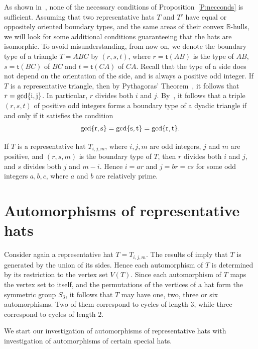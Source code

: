 \documentclass[12pt]{amsart}
\def\mbR{\mathbb{R}}
\theoremstyle{plain}
\theoremstyle{definition}
\numberwithin{equation}{section}
\begin{document}
As shown in~\cite[\S\S4,5]{MR25}, none of the necessary conditions of
Proposition~\ref{P:necconds} is sufficient.
Assuming that two representative hats $T$ and $T'$ have equal or oppositely oriented  boundary
types, and the same areas of their convex $\mbR$-hulls, we
will look for some additional conditions guaranteeing that the hats are isomorphic. To avoid
misunderstanding, from now on, we denote the boundary type of a triangle $T = ABC$ by $(r,s,t)$,
where $r = \mathsf{t}(AB)$ is the type of $AB$, $s = \mathsf{t}(BC)$ of $BC$ and
$t = \mathsf{t}(CA)$ of $CA$. Recall that the type of a side does not depend on the orientation of the side, and is always a positive odd integer. If $T$ is a representative triangle, then by Pythagoras' Theorem~\cite[Thm.~4.3]{MRS11}, it follows that $r = \rm{gcd}\{i,j\}$. In particular, $r$ divides both $i$ and $j$. By~\cite[Prop.~1.8]{MMR19a}, it follows that a triple $(r,s,t)$ of positive odd integers forms a boundary type of a dyadic triangle if and only if it satisfies the condition
\begin{equation}\label{E:rst}
\rm{gcd}\{r,s\} = \rm{gcd}\{s,t\} = \rm{gcd}\{r,t\}.
\end{equation}

If $T$ is a representative hat $T_{i,j,m}$, where $i, j, m$ are odd integers, $j$ and $m$ are
positive, and $(r,s,m)$ is the boundary type of $T$, then $r$ divides both $i$ and $j$, and $s$
divides both $j$ and $m-i$. Hence $i = ar$ and $j = br = cs$ for some odd integers $a, b,
c$, where $a$ and $b$ are relatively prime.




\section{Automorphisms of representative hats}\label{S:autoreprhats}

 Consider again a representative hat $T = T_{i,j,m}$. The results of \cite[\S6]{MMR23} imply
that $T$ is generated by the union of its sides. Hence each automorphism of $T$ is determined by its restriction to the vertex set $V(T)$.
Since each automorphism of $T$ maps the vertex set to itself, and the
permutations of the vertices of a hat form the symmetric group $S_3$, it follows that $T$ may
have one, two, three or six automorphisms. Two of them correspond to  cycles of length $3$,
while three correspond to cycles of length $2$.

We start our investigation of automorphisms of representative hats with investigation of
automorphisms of certain special hats.
\end{document}
